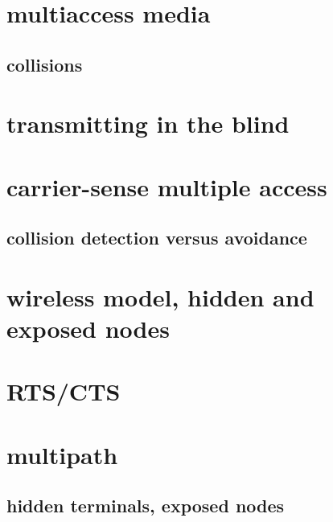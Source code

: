 \section{multiaccess media}



\subsection{collisions}


\section{transmitting in the blind}


\section{carrier-sense multiple access}


\subsection{collision detection versus avoidance}


\section{wireless model, hidden and exposed nodes} 


\section{RTS/CTS}


\section{multipath}


\subsection{hidden terminals, exposed nodes}

